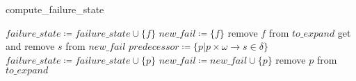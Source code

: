 \begin{algorithm}[h]
\Large
\caption{compute\_failure\_state}
\label{algo:comput_fail}
$failure\_state\coloneqq failure\_state\cup\{f\}$\;
$new\_fail\coloneqq \{f\}$\;
remove $f$ from $to\_expand$\;
{
    get and remove $s$ from $new\_fail$\;
    $predecessor\coloneqq\{p|p\times\omega\to s\in \delta\}$\;
    {
        {
            $failure\_state\coloneqq failure\_state\cup\{p\}$\;
            $new\_fail\coloneqq new\_fail\cup\{p\}$\;
            remove $p$ from $to\_expand$\;
        }
    }
}
\end{algorithm}
\fi




